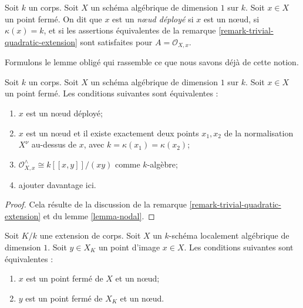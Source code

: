 \begin{definition}
\label{definition-split-node}
Soit $k$ un corps. Soit $X$ un schéma algébrique de dimension $1$ sur $k$. Soit $x \in X$ un point fermé. On dit que $x$ est un {\it nœud déployé} si $x$ est un nœud, si $\kappa(x) = k$, et si les assertions équivalentes de la remarque \ref{remark-trivial-quadratic-extension} sont satisfaites pour $A = \mathcal{O}_{X, x}$.
\end{definition}

\noindent
Formulons le lemme obligé qui rassemble ce que nous savons déjà de cette notion.

\begin{lemma}
\label{lemma-split-node}
Soit $k$ un corps. Soit $X$ un schéma algébrique de dimension $1$ sur $k$. Soit $x \in X$ un point fermé. Les conditions suivantes sont équivalentes : \begin{enumerate} \item $x$ est un nœud déployé; \item $x$ est un nœud et il existe exactement deux points $x_1, x_2$ de la normalisation $X^\nu$ au-dessus de $x$, avec $k = \kappa(x_1) = \kappa(x_2)$; \item $\mathcal{O}_{X, x}^\wedge \cong k[[x, y]]/(xy)$ comme $k$-algèbre; \item ajouter davantage ici.
\end{enumerate}
\end{lemma}

\begin{proof}
Cela résulte de la discussion de la remarque \ref{remark-trivial-quadratic-extension} et du lemme \ref{lemma-nodal}.
\end{proof}

\begin{lemma}
\label{lemma-node-field-extension}
Soit $K/k$ une extension de corps. Soit $X$ un $k$-schéma localement algébrique de dimension $1$. Soit $y \in X_K$ un point d'image $x \in X$. Les conditions suivantes sont équivalentes : \begin{enumerate} \item $x$ est un point fermé de $X$ et un nœud; \item $y$ est un point fermé de $X_K$ et un nœud.
\end{enumerate}
\end{lemma}

